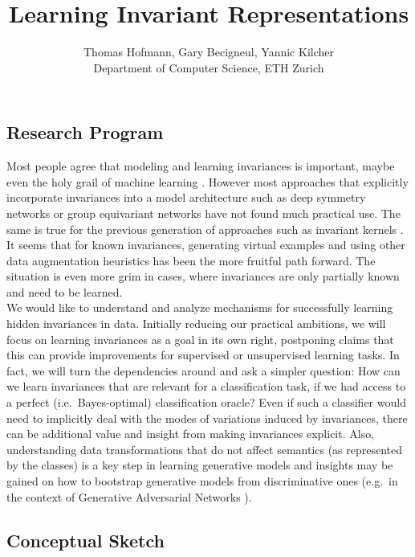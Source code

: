 \documentclass{article}
\title{Learning Invariant Representations}
\author{Thomas Hofmann, Gary Becigneul, Yannic Kilcher\\[2mm] Department of Computer Science, ETH Zurich}
\begin{document}
\maketitle

\subsection*{Research Program}

Most people agree that modeling and learning invariances is important, maybe even the holy grail of machine learning \cite{ferenc2015holy}. However most approaches that explicitly incorporate invariances into a model architecture such as deep symmetry networks \cite{gens2014deep} or group equivariant networks \cite{cohen2016group} have not found much practical use. The same is true for the previous generation of approaches such as invariant kernels \cite{burges1999geometry}. It seems that for known invariances, generating virtual examples \cite{niyogi1998incorporating} and using other data augmentation heuristics has been the more fruitful path forward. The situation is even more grim in cases, where invariances are only partially known and need to be learned. \\

We would like to understand and analyze mechanisms for successfully learning hidden invariances in data. Initially reducing our practical ambitions, we will focus on learning invariances as a goal in its own right, postponing claims that this can provide improvements for supervised or unsupervised learning tasks. In fact, we will turn the dependencies around and ask a simpler question: How can we learn invariances that are relevant for a classification task, if we had access to a perfect (i.e.~Bayes-optimal) classification oracle? Even if such a classifier would need to implicitly deal with the modes of variations induced by invariances, there can be additional value and insight from making invariances explicit. Also, understanding data transformations that do not affect semantics (as represented by the classes) is a key step in learning generative models and insights may be gained on how to bootstrap generative models from discriminative ones (e.g.~in the context of Generative Adversarial Networks \cite{goodfellow2014generative}). 


\subsection*{Conceptual Sketch}
\end{document}
